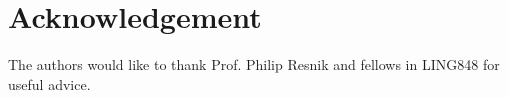 \section*{Acknowledgement}

The authors would like to thank Prof. Philip Resnik and fellows in LING848 for useful advice.